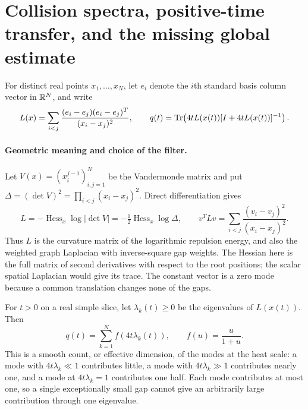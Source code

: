 
\section{Collision spectra, positive-time transfer, and the missing global estimate}
\label{sec:spectral-transfer}

For distinct real points $x_1,\ldots,x_N$, let $e_i$ denote the $i$th
standard basis column vector in $\mathbb R^N$, and write
\[
 L(x)=\sum_{i<j}\frac{(e_i-e_j)(e_i-e_j)^T}{(x_i-x_j)^2},
 \qquad q(t)=\operatorname{Tr}\!\left(4tL(x(t))[I+4tL(x(t))]^{-1}\right).
\]

\paragraph{Geometric meaning and choice of the filter.}
Let $V(x)=(x_i^{j-1})_{i,j=1}^N$ be the Vandermonde matrix and put
$\Delta=(\det V)^2=\prod_{i<j}(x_i-x_j)^2$. Direct differentiation gives
\begin{equation}
 L=-\operatorname{Hess}_x\log|\det V|
   =-\tfrac12\operatorname{Hess}_x\log\Delta,
 \qquad
 v^TLv=\sum_{i<j}\frac{(v_i-v_j)^2}{(x_i-x_j)^2}.
 \label{eq:vandermonde-hessian}
\end{equation}
Thus $L$ is the curvature matrix of the logarithmic repulsion energy,
and also the weighted graph Laplacian with inverse-square gap weights.
The Hessian here is the full matrix of second derivatives with respect to
the root positions; the scalar spatial Laplacian would give its trace.
The constant vector is a zero mode because a common translation changes
none of the gaps.

For $t>0$ on a real simple slice, let $\lambda_k(t)\ge0$ be the eigenvalues
of $L(x(t))$. Then
\begin{equation}
 q(t)=\sum_{k=1}^N f(4t\lambda_k(t)),
 \qquad f(u)=\frac{u}{1+u}.
 \label{eq:filter-effective-dimension}
\end{equation}
This is a smooth count, or effective dimension, of the modes at the heat
scale: a mode with $4t\lambda_k\ll1$ contributes little, a mode with
$4t\lambda_k\gg1$ contributes nearly one, and a mode at $4t\lambda_k=1$
contributes one half. Each mode contributes at most one, so a single
exceptionally small gap cannot give an arbitrarily large contribution
through one eigenvalue.

